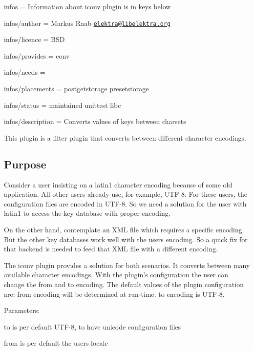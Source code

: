 
\begin{DoxyItemize}
\item infos = Information about iconv plugin is in keys below
\item infos/author = Markus Raab \href{mailto:elektra@libelektra.org}{\tt elektra@libelektra.\+org}
\item infos/licence = B\+SD
\item infos/provides = conv
\item infos/needs =
\item infos/placements = postgetstorage presetstorage
\item infos/status = maintained unittest libc
\item infos/description = Converts values of keys between charsets
\end{DoxyItemize}

This plugin is a filter plugin that converts between different character encodings.

\subsection*{Purpose}

Consider a user insisting on a {\ttfamily latin1} character encoding because of some old application. All other users already use, for example, {\ttfamily U\+T\+F-\/8}. For these users, the configuration files are encoded in {\ttfamily U\+T\+F-\/8}. So we need a solution for the user with {\ttfamily latin1} to access the key database with proper encoding.

On the other hand, contemplate an X\+ML file which requires a specific encoding. But the other key databases work well with the users encoding. So a quick fix for that backend is needed to feed that X\+ML file with a different encoding.

The iconv plugin provides a solution for both scenarios. It converts between many available character encodings. With the plugin’s configuration the user can change the from and to encoding. The default values of the plugin configuration are\+: {\ttfamily from} encoding will be determined at run-\/time. {\ttfamily to} encoding is {\ttfamily U\+T\+F-\/8}.

Parameters\+:


\begin{DoxyItemize}
\item {\ttfamily to} is per default U\+T\+F-\/8, to have unicode configuration files
\item {\ttfamily from} is per default the users locale
\end{DoxyItemize}

